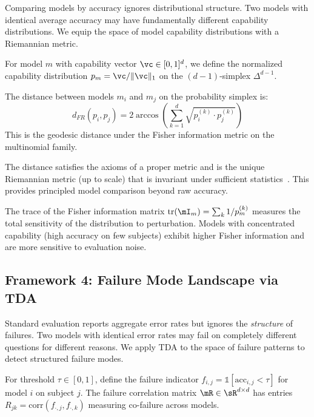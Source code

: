 Comparing models by accuracy ignores distributional structure.
Two models with identical average accuracy may have fundamentally different capability distributions.
We equip the space of model capability distributions with a Riemannian metric.

\begin{definition}
For model $m$ with capability vector $\vc \in [0,1]^d$, we define the normalized capability distribution $p_m = \vc / \|\vc\|_1$ on the $(d-1)$-simplex $\Delta^{d-1}$.
\end{definition}

\begin{definition}
The \fr distance between models $m_i$ and $m_j$ on the probability simplex is:
\begin{equation}
d_{FR}(p_i, p_j) = 2 \arccos\left(\sum_{k=1}^d \sqrt{p_i^{(k)} \cdot p_j^{(k)}}\right)
\end{equation}
This is the geodesic distance under the Fisher information metric on the multinomial family.
\end{definition}

The \fr distance satisfies the axioms of a proper metric and is the unique Riemannian metric (up to scale) that is invariant under sufficient statistics~\citep{cencov1982statistical}.
This provides principled model comparison beyond raw accuracy.

The trace of the Fisher information matrix $\text{tr}(\mI_m) = \sum_k 1/p_m^{(k)}$ measures the total sensitivity of the distribution to perturbation.
Models with concentrated capability (high accuracy on few subjects) exhibit higher Fisher information and are more sensitive to evaluation noise.

\subsection{Framework 4: Failure Mode Landscape via TDA}
\label{sec:failtda}

Standard evaluation reports aggregate error rates but ignores the \emph{structure} of failures.
Two models with identical error rates may fail on completely different questions for different reasons.
We apply TDA to the space of failure patterns to detect structured failure modes.

\begin{definition}
For threshold $\tau \in [0,1]$, define the failure indicator $f_{i,j} = \mathbb{1}[\text{acc}_{i,j} < \tau]$ for model $i$ on subject $j$.
The failure correlation matrix $\mR \in \sR^{d \times d}$ has entries $R_{jk} = \text{corr}(f_{\cdot,j}, f_{\cdot,k})$ measuring co-failure across models.
\end{definition}

